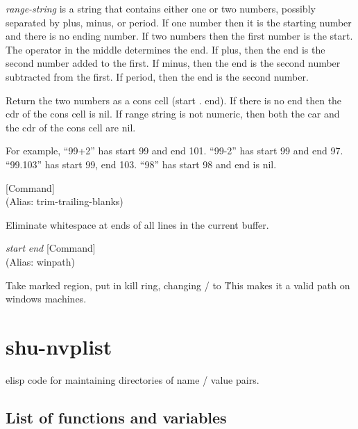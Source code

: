 \begin{doc-string}
\emph{range-string} is a string that contains either one or two numbers, possibly
separated by plus, minus, or period.  If one number then it is the starting number
and there is no ending number.  If two numbers then the first number is the start.
The operator in the middle determines the end.  If plus, then the end is the
second number added to the first.  If minus, then the end is the second number
subtracted from the first.  If period, then the end is the second number.

Return the two numbers as a cons cell (start . end).  If there is no end then the
cdr of the cons cell is nil.  If range string is not numeric, then both the car
and the cdr of the cons cell are nil.

For example, ``99+2'' has start 99 and end 101.  ``99-2'' has start 99 and end 97.
``99.103'' has start 99, end 103.  ``98'' has start 98 and end is nil.
\end{doc-string}

\vspace{1em}
\noindent
{}
\usebox{\funcname}
 \hfill [Command]\\%
 (Alias: trim-trailing-blanks)

\begin{doc-string}
Eliminate whitespace at ends of all lines in the current buffer.
\end{doc-string}

\vspace{1em}
\noindent
{}
\usebox{\funcname}\emph{start} \emph{end}
 \hfill [Command]\\%
 (Alias: winpath)

\begin{doc-string}
Take marked region, put in kill ring, changing / to \.
This makes it a valid path on windows machines.
\end{doc-string}

\section{shu-nvplist}


elisp code for maintaining directories of name / value pairs.


\subsection{List of functions and variables}

